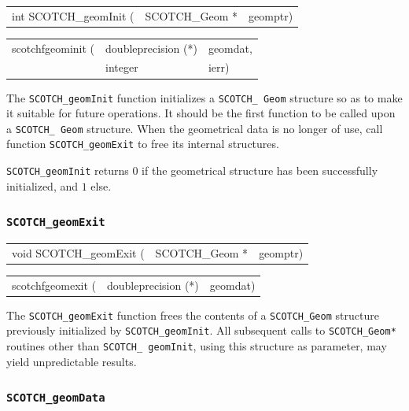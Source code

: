\begin{itemize}
\progsyn

{\tt\begin{tabular}{l@{}ll}
int SCOTCH\_geomInit ( & SCOTCH\_Geom * & geomptr)
\end{tabular}}

{\tt\begin{tabular}{l@{}ll}
scotchfgeominit ( & doubleprecision (*) & geomdat, \\
                  & integer             & ierr)
\end{tabular}}

\progdes

The {\tt SCOTCH\_geomInit} function initializes a {\tt SCOTCH\_\lbt
Geom} structure so as to make it suitable for future operations. It
should be the first function to be called upon a {\tt SCOTCH\_\lbt
Geom} structure. When the geometrical data is no longer of use, call
function {\tt SCOTCH\_\lbt geom\lbt Exit} to free its internal
structures.

\progret

{\tt SCOTCH\_geomInit} returns $0$ if the geometrical structure has been
successfully initialized, and $1$ else.
\end{itemize}

\subsubsection{{\tt SCOTCH\_geomExit}}

\begin{itemize}
\progsyn

{\tt\begin{tabular}{l@{}ll}
void SCOTCH\_geomExit ( & SCOTCH\_Geom * & geomptr)
\end{tabular}}

{\tt\begin{tabular}{l@{}ll}
scotchfgeomexit ( & doubleprecision (*) & geomdat)
\end{tabular}}

\progdes

The {\tt SCOTCH\_geomExit} function frees the contents of a
{\tt SCOTCH\_\lbt Geom} structure previously initialized by
{\tt SCOTCH\_\lbt geomInit}. All subsequent calls to
{\tt SCOTCH\_\lbt *Geom*} routines other than {\tt SCOTCH\_\lbt
geomInit}, using this structure as parameter, may yield
unpredictable results.
\end{itemize}

\subsubsection{{\tt SCOTCH\_geomData}}
\label{sec-lib-func-geomdata}

